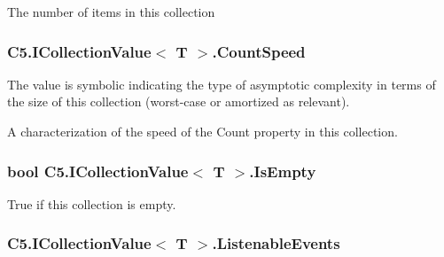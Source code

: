 The number of items in this collection\hypertarget{interface_c5_1_1_i_collection_value_aeaf5f215b7f6b1b3aec0a8cd939ea1a9}{}
\subsubsection[{Count\+Speed}]{ {\bf C5.\+I\+Collection\+Value}$<$ T $>$.Count\+Speed\hspace{0.3cm}{\ttfamily [get]}}\label{interface_c5_1_1_i_collection_value_aeaf5f215b7f6b1b3aec0a8cd939ea1a9}


The value is symbolic indicating the type of asymptotic complexity in terms of the size of this collection (worst-\/case or amortized as relevant). 

A characterization of the speed of the {\ttfamily Count} property in this collection.\hypertarget{interface_c5_1_1_i_collection_value_af731142c68c50403553a545318dcae01}{}
\subsubsection[{Is\+Empty}]{\setlength{\rightskip}{0pt plus 5cm}bool {\bf C5.\+I\+Collection\+Value}$<$ T $>$.Is\+Empty\hspace{0.3cm}{\ttfamily [get]}}\label{interface_c5_1_1_i_collection_value_af731142c68c50403553a545318dcae01}




True if this collection is empty.\hypertarget{interface_c5_1_1_i_collection_value_ac19b17d9b2ca7f2717013e4a8076e481}{}
\subsubsection[{Listenable\+Events}]{ {\bf C5.\+I\+Collection\+Value}$<$ T $>$.Listenable\+Events\hspace{0.3cm}{\ttfamily [get]}}\label{interface_c5_1_1_i_collection_value_ac19b17d9b2ca7f2717013e4a8076e481}


